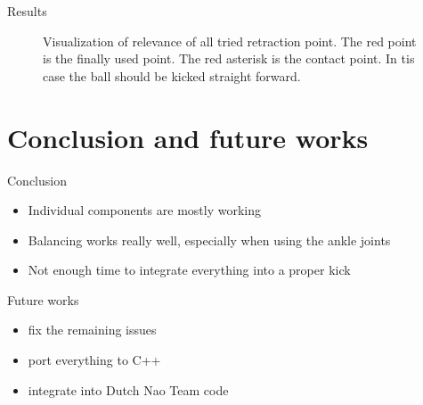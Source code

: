\documentclass{beamer}
\begin{document}
\begin{frame}{Results}
\begin{figure}[htbp]
  \centering
  \caption{Visualization of relevance of all tried retraction point. The red
      point is the finally used point. The red asterisk is the contact point. In
      tis case the ball should be kicked straight forward.
         }
  \label{fig:retraction_plot1}
\end{figure}
\end{frame}

\section{Conclusion and future works}

\begin{frame}{Conclusion}
  \begin{itemize}
    \item Individual components are mostly working
    \item Balancing works really well, especially when using the ankle joints
    \item Not enough time to integrate everything into a proper kick
  \end{itemize}
\end{frame}

\begin{frame}{Future works}
  \begin{itemize}
    \item fix the remaining issues
    \item port everything to C++
    \item integrate into Dutch Nao Team code
  \end{itemize}
\end{frame}
\end{document}

